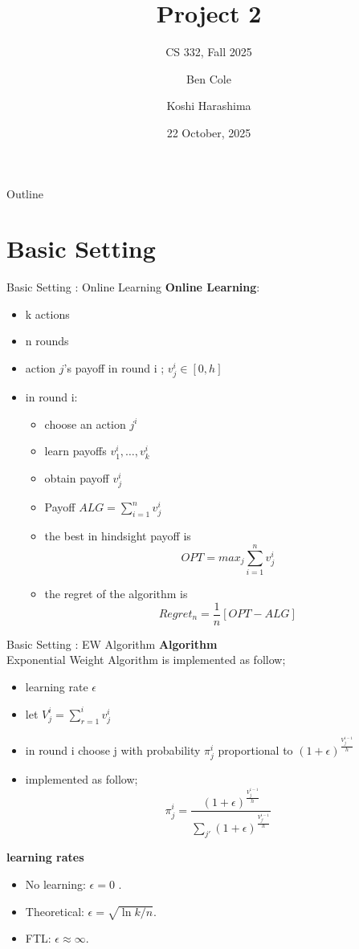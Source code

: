 \documentclass{beamer}
\title[Project 2]{Project 2}
\subtitle{CS 332, Fall 2025}
\author{Ben Cole \and Koshi Harashima}
\date{22 October, 2025}
\begin{document}
\maketitle

\begin{frame}{Outline}
  \tableofcontents
\end{frame}

\section{Basic Setting}
\begin{frame}{Basic Setting : Online Learning}
\textbf{Online Learning}: 
\begin{itemize}
    \item k actions
    \item n rounds
    \item action $j$'s payoff in round i ; $v_j^i \in [0,h]$
    \item in round i:
    \begin{itemize}
        \item choose an action $j^i$
        \item learn payoffs $v_1^i, \dots, v_k^i$
        \item obtain payoff $v_j^i$
    \item Payoff $ALG = \sum_{i = 1} ^n v_j^i$
    \item the best in hindsight payoff is 
    \[
    OPT = max_j \sum_{i = 1} ^n v_j^i
    \]
    \item the regret of the algorithm is 
    \[
    Regret_n = \frac{1}{n}[OPT - ALG]
    \]
    \end{itemize}   
\end{itemize}
\end{frame}

\begin{frame}{Basic Setting : EW Algorithm}
\textbf{Algorithm}\\
Exponential Weight Algorithm is implemented as follow; 
\begin{itemize}
    \item learning rate $\epsilon$
    \item let $V_j^i = \sum_{r = 1}^i v_j^i$
    \item in round i choose j with probability $\pi_j^i$ proportional to $(1+\epsilon)^{\frac{V_j^{i-1}}{h}}$
    \item implemented as follow;
    \[
        \pi_j^i = \frac{(1+\epsilon)^{\frac{V_j^{i-1}}{h}}}{\sum_{j'}(1+\epsilon)^{\frac{V_{j'}^{i-1}}{h}}}
    \]
\end{itemize}
\textbf{learning rates}\\
\begin{itemize}
  \item No learning: \(\epsilon = 0\) .
  \item Theoretical: \(\epsilon = \sqrt{\ln k / n}\).
  \item FTL:  \(\epsilon \approx \infty\).
\end{itemize}
\end{frame}
\end{document}
